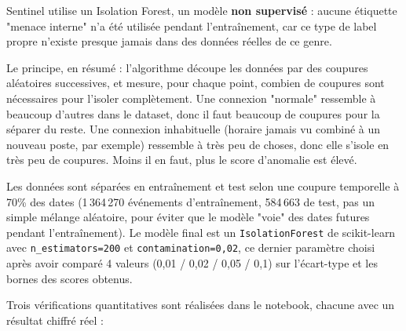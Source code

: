 \documentclass[12pt,a4paper]{report}
\begin{document}
Sentinel utilise un Isolation Forest, un modèle \textbf{non supervisé} : aucune étiquette "menace interne" n'a été utilisée pendant l'entraînement, car ce type de label propre n'existe presque jamais dans des données réelles de ce genre.

Le principe, en résumé : l'algorithme découpe les données par des coupures aléatoires successives, et mesure, pour chaque point, combien de coupures sont nécessaires pour l'isoler complètement. Une connexion "normale" ressemble à beaucoup d'autres dans le dataset, donc il faut beaucoup de coupures pour la séparer du reste. Une connexion inhabituelle (horaire jamais vu combiné à un nouveau poste, par exemple) ressemble à très peu de choses, donc elle s'isole en très peu de coupures. Moins il en faut, plus le score d'anomalie est élevé.

Les données sont séparées en entraînement et test selon une coupure temporelle à 70\% des dates (1\,364\,270 événements d'entraînement, 584\,663 de test, pas un simple mélange aléatoire, pour éviter que le modèle "voie" des dates futures pendant l'entraînement). Le modèle final est un \texttt{IsolationForest} de scikit-learn avec \texttt{n\_estimators=200} et \texttt{contamination=0,02}, ce dernier paramètre choisi après avoir comparé 4 valeurs (0,01 / 0,02 / 0,05 / 0,1) sur l'écart-type et les bornes des scores obtenus.

Trois vérifications quantitatives sont réalisées dans le notebook, chacune avec un résultat chiffré réel :
\end{document}
